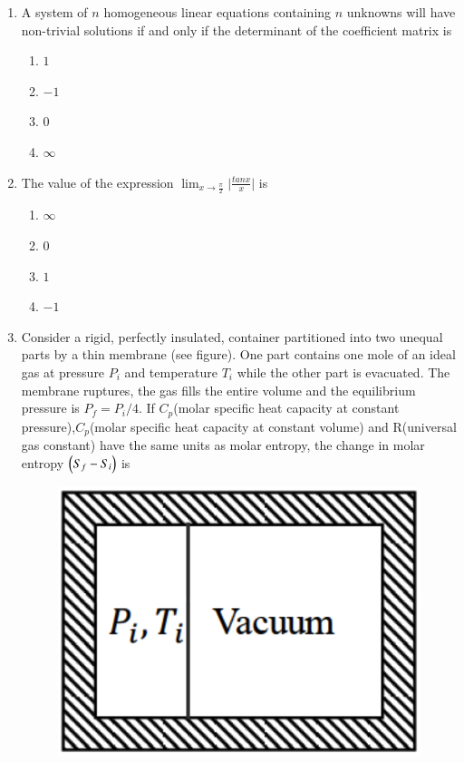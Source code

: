 \documentclass[journal,12pt,onecolumn]{IEEEtran}
\theoremstyle{remark}
\begin{document}
\begin{enumerate}
    \item A system of $n$ homogeneous linear equations containing $n$ unknowns will have non-trivial solutions if and only if the determinant of the coefficient matrix is
    
 \hfill{}
\begin{multicols}{4}
    \begin{enumerate}
        \item $1$
        \item $-1$
        \item $0$
        \item $\infty$
    \end{enumerate}
\end{multicols}

    \item The value of the expression $\lim_{x\to\frac{\pi}{2}}\big|\frac{tan x}{x}\big|$  is
    
 \hfill{}
\begin{multicols}{4}
    \begin{enumerate}
        \item $\infty$
        \item $0$
        \item $1$
        \item $-1$
    \end{enumerate}
\end{multicols}
    \item Consider a rigid, perfectly insulated, container partitioned into two unequal parts by a thin membrane (see figure). One part contains one mole of an ideal gas at pressure {$P_i$} and temperature $T_i$ while the other part is evacuated. The membrane ruptures, the gas fills the entire volume and the equilibrium pressure is $P_f = P_i/4$. If $C_p$(molar specific heat capacity at constant pressure),$C_p$(molar specific heat capacity at constant volume) and R(universal gas constant) have the same units as molar entropy, the change in molar entropy $\left(S_f - S_i\right)$ is
    
 \hfill{}
 \begin{figure}[H]
     \centering
     \includegraphics[width=0.3\columnwidth]{Fig/3.png}
     \caption{}
     \label{fig:3}
 \end{figure}


\end{enumerate}
\end{document}
